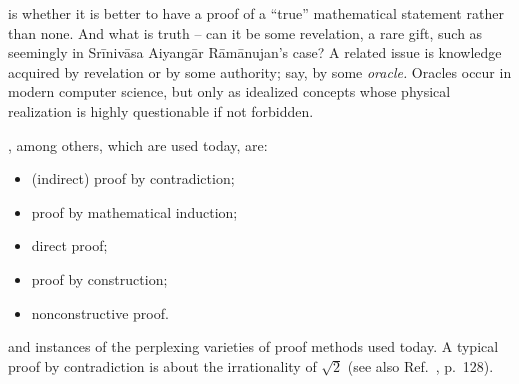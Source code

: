  is whether it is better to have a proof of a ``true'' mathematical statement rather than none.
And what is truth -- can it be some revelation, a rare gift, such as seemingly in Sr\={i}niv\={a}sa Aiyang\={a}r
R\={a}m\={a}nujan's case?
{A related issue} is knowledge acquired by revelation or by some authority; say, by some {\em oracle.}
Oracles occur in modern computer science,
but only as idealized concepts whose physical realization is highly
questionable if not forbidden.

, among others, which are used today, are:
\begin{itemize}
\item
(indirect) proof by contradiction;
\item
proof by mathematical induction;
\item
direct proof;
\item
proof by construction;
\item
nonconstructive proof.
\end{itemize}


 and instances of the perplexing varieties of proof methods used today.
A typical proof by contradiction is about the irrationality of $\sqrt{2}$
(see also Ref.~\cite{Alsina}, p.~128).

